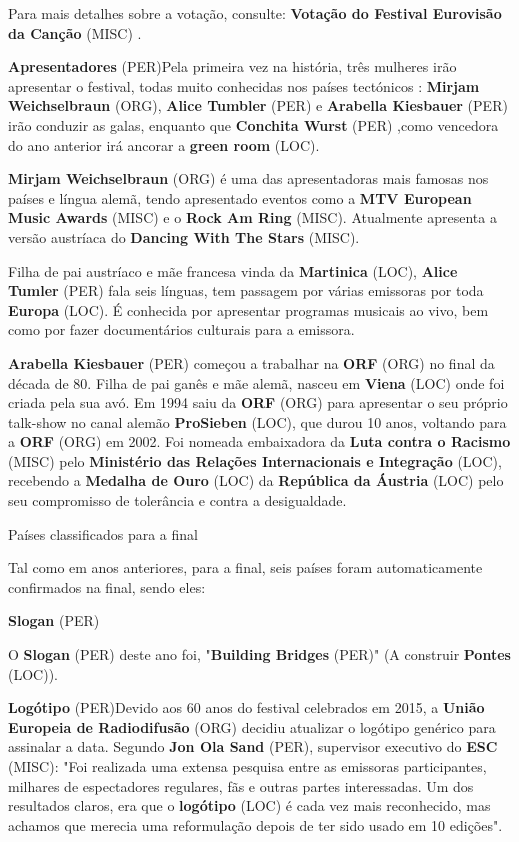\documentclass[12pt,a4paper]{article}
\begin{document}
Para mais detalhes sobre a votação, consulte: \textbf{Votação do Festival Eurovisão da Canção} (MISC) .



\textbf{Apresentadores} (PER)Pela primeira vez na história, três mulheres irão apresentar o festival, todas muito conhecidas nos países tectónicos : \textbf{Mirjam Weichselbraun} (ORG), \textbf{Alice Tumbler} (PER) e \textbf{Arabella Kiesbauer} (PER) irão conduzir as galas, enquanto que \textbf{Conchita Wurst} (PER) ,como vencedora do ano anterior irá ancorar a \textbf{green room} (LOC).

\textbf{Mirjam Weichselbraun} (ORG) é uma das apresentadoras mais famosas nos países e língua alemã, tendo apresentado eventos como a \textbf{MTV European Music Awards} (MISC) e o \textbf{Rock Am Ring} (MISC). Atualmente apresenta a versão austríaca do \textbf{Dancing With The Stars} (MISC).

Filha de pai austríaco e mãe francesa vinda da \textbf{Martinica} (LOC), \textbf{Alice Tumler} (PER) fala seis línguas, tem passagem por várias emissoras por toda \textbf{Europa} (LOC). É conhecida por apresentar programas musicais ao vivo, bem como por fazer documentários culturais para a emissora.

\textbf{Arabella Kiesbauer} (PER) começou a trabalhar na \textbf{ORF} (ORG) no final da década de 80. Filha de pai ganês e mãe alemã, nasceu em \textbf{Viena} (LOC) onde foi criada pela sua avó. Em 1994 saiu da \textbf{ORF} (ORG) para apresentar o seu próprio talk-show no canal alemão \textbf{ProSieben} (LOC), que durou 10 anos, voltando para a \textbf{ORF} (ORG) em 2002. Foi nomeada embaixadora da \textbf{Luta contra o Racismo} (MISC) pelo \textbf{Ministério das Relações Internacionais e Integração} (LOC), recebendo a \textbf{Medalha de Ouro} (LOC) da \textbf{República da Áustria} (LOC) pelo seu compromisso de tolerância e contra a desigualdade.



Países classificados para a final

Tal como em anos anteriores, para a final, seis países foram automaticamente confirmados na final, sendo eles:



\textbf{Slogan} (PER)

O \textbf{Slogan} (PER) deste ano foi, "\textbf{Building Bridges} (PER)" (A construir \textbf{Pontes} (LOC)).



\textbf{Logótipo} (PER)Devido aos 60 anos do festival celebrados em 2015, a \textbf{União Europeia de Radiodifusão} (ORG) decidiu atualizar o logótipo genérico para assinalar a data. Segundo \textbf{Jon Ola Sand} (PER), supervisor executivo do \textbf{ESC} (MISC): "Foi realizada uma extensa pesquisa entre as emissoras participantes, milhares de espectadores regulares, fãs e outras partes interessadas. Um dos resultados claros, era que o \textbf{logótipo} (LOC) é cada vez mais reconhecido, mas achamos que merecia uma reformulação depois de ter sido usado em 10 edições".
\end{document}
